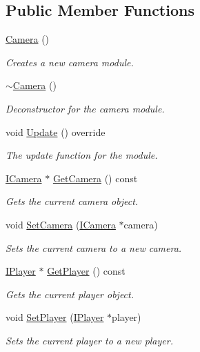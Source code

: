 \subsection*{Public Member Functions}
\begin{DoxyCompactItemize}
\item 
\hyperlink{class_flounder_1_1_camera_ae1b692ec2be6286b102f4fd0ca2db02c}{Camera} ()
\begin{DoxyCompactList}\small\item\em Creates a new camera module. \end{DoxyCompactList}\item 
\hyperlink{class_flounder_1_1_camera_aa79089a994c41771463daaf2c88807f0}{$\sim$\+Camera} ()
\begin{DoxyCompactList}\small\item\em Deconstructor for the camera module. \end{DoxyCompactList}\item 
void \hyperlink{class_flounder_1_1_camera_a2469c44c33c89cb8f85be0e2441eccbf}{Update} () override
\begin{DoxyCompactList}\small\item\em The update function for the module. \end{DoxyCompactList}\item 
\hyperlink{class_flounder_1_1_i_camera}{I\+Camera} $\ast$ \hyperlink{class_flounder_1_1_camera_a17176aafe2b546633e326e24c953a061}{Get\+Camera} () const
\begin{DoxyCompactList}\small\item\em Gets the current camera object. \end{DoxyCompactList}\item 
void \hyperlink{class_flounder_1_1_camera_a232b98e6afdab6749cfa9ac3625f2c49}{Set\+Camera} (\hyperlink{class_flounder_1_1_i_camera}{I\+Camera} $\ast$camera)
\begin{DoxyCompactList}\small\item\em Sets the current camera to a new camera. \end{DoxyCompactList}\item 
\hyperlink{class_flounder_1_1_i_player}{I\+Player} $\ast$ \hyperlink{class_flounder_1_1_camera_a7eef198b45ea2a46f72840a4140de8b5}{Get\+Player} () const
\begin{DoxyCompactList}\small\item\em Gets the current player object. \end{DoxyCompactList}\item 
void \hyperlink{class_flounder_1_1_camera_a56d731269ad10b8c69f395f841b4e63f}{Set\+Player} (\hyperlink{class_flounder_1_1_i_player}{I\+Player} $\ast$player)
\begin{DoxyCompactList}\small\item\em Sets the current player to a new player. \end{DoxyCompactList}\end{DoxyCompactItemize}
